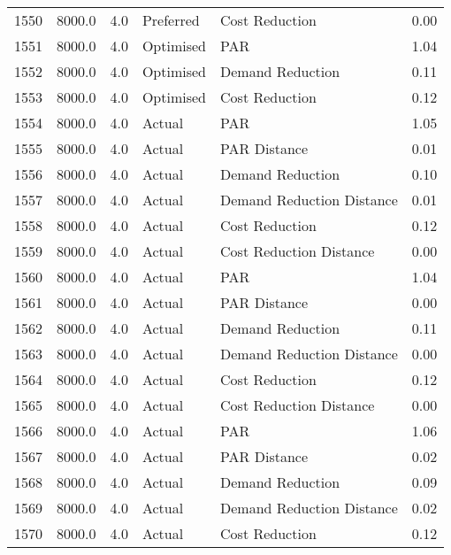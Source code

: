 \begin{longtable}{lrrllr}
1550 &       8000.0 &     4.0 &      Preferred &             Cost Reduction &   0.00 \\
1551 &       8000.0 &     4.0 &      Optimised &                        PAR &   1.04 \\
1552 &       8000.0 &     4.0 &      Optimised &           Demand Reduction &   0.11 \\
1553 &       8000.0 &     4.0 &      Optimised &             Cost Reduction &   0.12 \\
1554 &       8000.0 &     4.0 &         Actual &                        PAR &   1.05 \\
1555 &       8000.0 &     4.0 &         Actual &               PAR Distance &   0.01 \\
1556 &       8000.0 &     4.0 &         Actual &           Demand Reduction &   0.10 \\
1557 &       8000.0 &     4.0 &         Actual &  Demand Reduction Distance &   0.01 \\
1558 &       8000.0 &     4.0 &         Actual &             Cost Reduction &   0.12 \\
1559 &       8000.0 &     4.0 &         Actual &    Cost Reduction Distance &   0.00 \\
1560 &       8000.0 &     4.0 &         Actual &                        PAR &   1.04 \\
1561 &       8000.0 &     4.0 &         Actual &               PAR Distance &   0.00 \\
1562 &       8000.0 &     4.0 &         Actual &           Demand Reduction &   0.11 \\
1563 &       8000.0 &     4.0 &         Actual &  Demand Reduction Distance &   0.00 \\
1564 &       8000.0 &     4.0 &         Actual &             Cost Reduction &   0.12 \\
1565 &       8000.0 &     4.0 &         Actual &    Cost Reduction Distance &   0.00 \\
1566 &       8000.0 &     4.0 &         Actual &                        PAR &   1.06 \\
1567 &       8000.0 &     4.0 &         Actual &               PAR Distance &   0.02 \\
1568 &       8000.0 &     4.0 &         Actual &           Demand Reduction &   0.09 \\
1569 &       8000.0 &     4.0 &         Actual &  Demand Reduction Distance &   0.02 \\
1570 &       8000.0 &     4.0 &         Actual &             Cost Reduction &   0.12 \\

\end{longtable}

